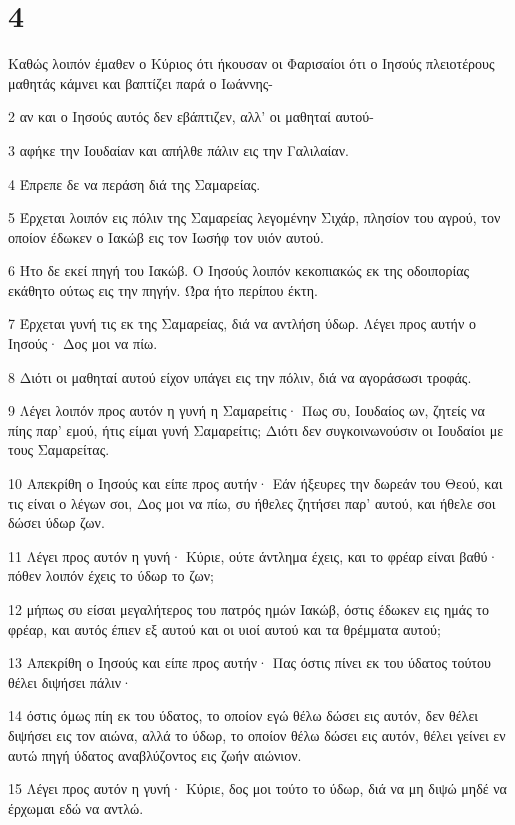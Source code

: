 \chapter{4}

\par Καθώς λοιπόν έμαθεν ο Κύριος ότι ήκουσαν οι Φαρισαίοι ότι ο Ιησούς πλειοτέρους μαθητάς κάμνει και βαπτίζει παρά ο Ιωάννης-
\par 2 αν και ο Ιησούς αυτός δεν εβάπτιζεν, αλλ' οι μαθηταί αυτού-
\par 3 αφήκε την Ιουδαίαν και απήλθε πάλιν εις την Γαλιλαίαν.
\par 4 Έπρεπε δε να περάση διά της Σαμαρείας.
\par 5 Έρχεται λοιπόν εις πόλιν της Σαμαρείας λεγομένην Σιχάρ, πλησίον του αγρού, τον οποίον έδωκεν ο Ιακώβ εις τον Ιωσήφ τον υιόν αυτού.
\par 6 Ήτο δε εκεί πηγή του Ιακώβ. Ο Ιησούς λοιπόν κεκοπιακώς εκ της οδοιπορίας εκάθητο ούτως εις την πηγήν. Ώρα ήτο περίπου έκτη.
\par 7 Έρχεται γυνή τις εκ της Σαμαρείας, διά να αντλήση ύδωρ. Λέγει προς αυτήν ο Ιησούς· Δος μοι να πίω.
\par 8 Διότι οι μαθηταί αυτού είχον υπάγει εις την πόλιν, διά να αγοράσωσι τροφάς.
\par 9 Λέγει λοιπόν προς αυτόν η γυνή η Σαμαρείτις· Πως συ, Ιουδαίος ων, ζητείς να πίης παρ' εμού, ήτις είμαι γυνή Σαμαρείτις; Διότι δεν συγκοινωνούσιν οι Ιουδαίοι με τους Σαμαρείτας.
\par 10 Απεκρίθη ο Ιησούς και είπε προς αυτήν· Εάν ήξευρες την δωρεάν του Θεού, και τις είναι ο λέγων σοι, Δος μοι να πίω, συ ήθελες ζητήσει παρ' αυτού, και ήθελε σοι δώσει ύδωρ ζων.
\par 11 Λέγει προς αυτόν η γυνή· Κύριε, ούτε άντλημα έχεις, και το φρέαρ είναι βαθύ· πόθεν λοιπόν έχεις το ύδωρ το ζων;
\par 12 μήπως συ είσαι μεγαλήτερος του πατρός ημών Ιακώβ, όστις έδωκεν εις ημάς το φρέαρ, και αυτός έπιεν εξ αυτού και οι υιοί αυτού και τα θρέμματα αυτού;
\par 13 Απεκρίθη ο Ιησούς και είπε προς αυτήν· Πας όστις πίνει εκ του ύδατος τούτου θέλει διψήσει πάλιν·
\par 14 όστις όμως πίη εκ του ύδατος, το οποίον εγώ θέλω δώσει εις αυτόν, δεν θέλει διψήσει εις τον αιώνα, αλλά το ύδωρ, το οποίον θέλω δώσει εις αυτόν, θέλει γείνει εν αυτώ πηγή ύδατος αναβλύζοντος εις ζωήν αιώνιον.
\par 15 Λέγει προς αυτόν η γυνή· Κύριε, δος μοι τούτο το ύδωρ, διά να μη διψώ μηδέ να έρχωμαι εδώ να αντλώ.
